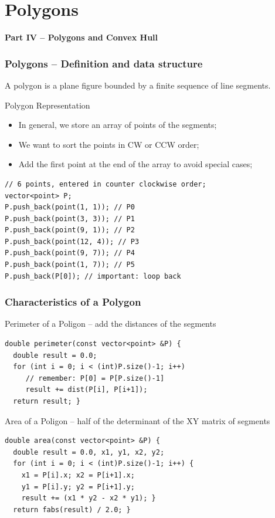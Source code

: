 \section{Polygons}

\begin{frame}
  \centering
  {\bf Part IV -- Polygons and Convex Hull}

\end{frame}

\begin{frame}[fragile]
  \frametitle{Polygons -- Definition and data structure}

    A polygon is a plane figure bounded by a finite sequence of line
    segments.

  \begin{exampleblock}{Polygon Representation}
    \begin{itemize}
    \item In general, we store an array of points of the segments;
    \item We want to sort the points in CW or CCW order;
    \item Add the first point at the end of the array to avoid
      special cases;
    \end{itemize}
{\smaller
\begin{verbatim}
// 6 points, entered in counter clockwise order;
vector<point> P;
P.push_back(point(1, 1)); // P0
P.push_back(point(3, 3)); // P1
P.push_back(point(9, 1)); // P2
P.push_back(point(12, 4)); // P3
P.push_back(point(9, 7)); // P4
P.push_back(point(1, 7)); // P5
P.push_back(P[0]); // important: loop back
\end{verbatim}}
\end{exampleblock}
\end{frame}

\begin{frame}[fragile]
  \frametitle{Characteristics of a Polygon}
  {\smaller
    \begin{exampleblock}{Perimeter of a Poligon -- add the distances of the segments}
\begin{verbatim}
double perimeter(const vector<point> &P) {
  double result = 0.0;
  for (int i = 0; i < (int)P.size()-1; i++)
     // remember: P[0] = P[P.size()-1]
     result += dist(P[i], P[i+1]);
  return result; }
\end{verbatim}
    \end{exampleblock}

    \begin{exampleblock}{Area of a Poligon -- half of the determinant of the XY matrix of segments}
\begin{verbatim}
double area(const vector<point> &P) {
  double result = 0.0, x1, y1, x2, y2;
  for (int i = 0; i < (int)P.size()-1; i++) {
    x1 = P[i].x; x2 = P[i+1].x;
    y1 = P[i].y; y2 = P[i+1].y;
    result += (x1 * y2 - x2 * y1); }
  return fabs(result) / 2.0; }
\end{verbatim}
    \end{exampleblock}
}
\end{frame}


